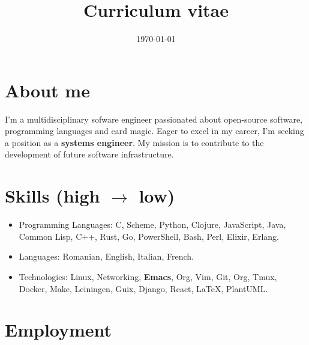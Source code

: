 \documentclass{moderncv}
\date{\today}
\title{Curriculum vitae}
\begin{document}
\maketitle

\section{About me}
\label{sec:org9b29e94}
I'm a multidisciplinary sofware engineer passionated 
about open-source software, programming languages 
and card magic. Eager to excel in my career, 
I'm seeking a position as a \textbf{systems engineer}. 
My mission is to contribute to the development 
of future software infrastructure.

\section{Skills (high \(\rightarrow\) low)}
\label{sec:orge2221e7}
\begin{itemize}
\item Programming Languages: C, Scheme, Python, Clojure, 
JavaScript, Java, Common Lisp, C++, Rust, Go, 
PowerShell, Bash, Perl, Elixir, Erlang.
\item Languages: Romanian, English, Italian, French.
\item Technologies: Linux, Networking, \textbf{Emacs}, Org, Vim, 
Git, Org, Tmux, Docker, Make, Leiningen, Guix,  
Django, React, \LaTeX{}, PlantUML.
\end{itemize}
\section{Employment}
\label{sec:org3320920}
\end{document}
